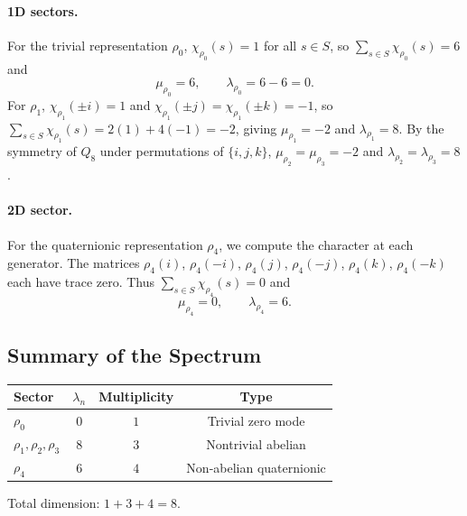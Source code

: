 \documentclass[11pt,a4paper]{article}
\begin{document}
      \paragraph{1D sectors.}
        For the trivial representation $\rho_0$, $\chi_{\rho_0}(s) = 1$ for all
        $s \in S$, so $\sum_{s \in S} \chi_{\rho_0}(s) = 6$ and
      \begin{equation}
        \mu_{\rho_0} = 6,
        \qquad
        \lambda_{\rho_0} = 6 - 6 = 0.
        \end{equation}
        For $\rho_1$, $\chi_{\rho_1}(\pm i) = 1$ and
        $\chi_{\rho_1}(\pm j) = \chi_{\rho_1}(\pm k) = -1$,
        so $\sum_{s \in S} \chi_{\rho_1}(s) = 2(1) + 4(-1) = -2$, giving
        $\mu_{\rho_1} = -2$ and $\lambda_{\rho_1} = 8$.
        By the symmetry of $Q_8$ under permutations of $\{i,j,k\}$,
        $\mu_{\rho_2} = \mu_{\rho_3} = -2$ and
        $\lambda_{\rho_2} = \lambda_{\rho_3} = 8$.

      \paragraph{2D sector.}
        For the quaternionic representation $\rho_4$, we compute the character at each
        generator.
        The matrices $\rho_4(i)$, $\rho_4(-i)$, $\rho_4(j)$, $\rho_4(-j)$,
        $\rho_4(k)$, $\rho_4(-k)$ each have trace zero.
        Thus $\sum_{s \in S} \chi_{\rho_4}(s) = 0$ and
      \begin{equation}
        \mu_{\rho_4} = 0,
        \qquad
        \lambda_{\rho_4} = 6.
        \end{equation}

  \subsection{Summary of the Spectrum}

    \begin{center}
      \begin{tabular}{lccc}
        \hline
        Sector                   & $\lambda_n$ & Multiplicity & Type                     \\
        \hline
        $\rho_0$                 & $0$         & $1$          & Trivial zero mode        \\
        $\rho_1, \rho_2, \rho_3$ & $8$         & $3$          & Nontrivial abelian       \\
        $\rho_4$                 & $6$         & $4$          & Non-abelian quaternionic \\
        \hline
      \end{tabular}
    \end{center}
    Total dimension: $1 + 3 + 4 = 8$.
\end{document}
